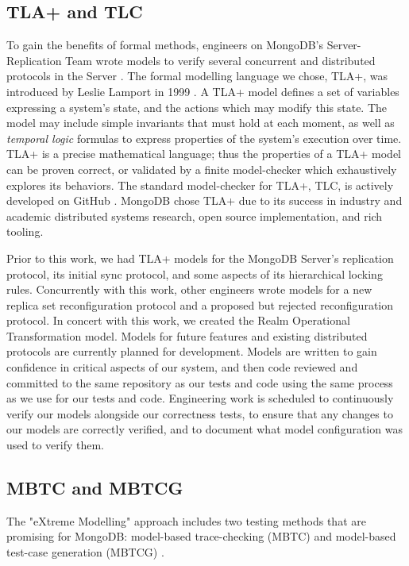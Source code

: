 \documentclass{vldb}
\begin{document}
\subsection{TLA+ and TLC}
\label{subsec:background_tla_tlc}

To gain the benefits of formal methods, engineers on MongoDB's Server-Replication Team wrote models to verify several concurrent and distributed protocols in the Server \cite{Schultz19BugsLife}.
The formal modelling language we chose, TLA+, was introduced by Leslie Lamport in 1999 \cite{Lamport99TLAPlus, Lamport02SpecifyingSystems}.
A TLA+ model defines a set of variables expressing a system's state, and the actions which may modify this state.
The model may include simple invariants that must hold at each moment, as well as \textit{temporal logic} formulas to express properties of the system's execution over time.
TLA+ is a precise mathematical language; thus the properties of a TLA+ model can be proven correct, or validated by a finite model-checker which exhaustively explores its behaviors.
The standard model-checker for TLA+, TLC, is actively developed on GitHub \cite{TLAPlusGitHub}.
MongoDB chose TLA+ due to its success in industry and academic distributed systems research, open source implementation, and rich tooling.

Prior to this work, we had TLA+ models for the MongoDB Server's replication protocol, its initial sync protocol, and some aspects of its hierarchical locking rules.
Concurrently with this work, other engineers wrote models for a new replica set reconfiguration protocol and a proposed but rejected reconfiguration protocol.
In concert with this work, we created the Realm Operational Transformation model.
Models for future features and existing distributed protocols are currently planned for development.
Models are written to gain confidence in critical aspects of our system, and then code reviewed and committed to the same repository as our tests and code using the same process as we use for our tests and code.
Engineering work is scheduled to continuously verify our models alongside our correctness tests, to ensure that any changes to our models are correctly verified, and to document what model configuration was used to verify them.

\subsection{MBTC and MBTCG}
\label{subsec:background_mbtc_mbt}

The "eXtreme Modelling" approach includes two testing methods that are promising for MongoDB: model-based trace-checking (MBTC) \cite{Jard83AnApproachToTestingSpecifications, MBTC} and model-based test-case generation (MBTCG) \cite{Utting06PracticalModelBasedTesting}. 
\end{document}
